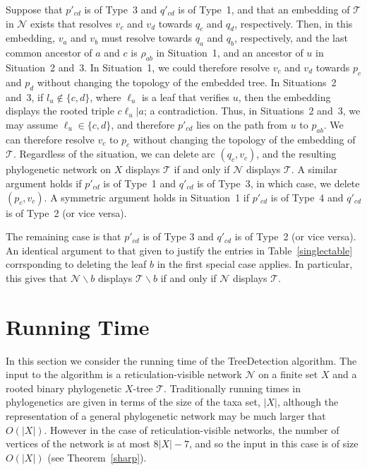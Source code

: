 \documentclass[11pt]{amsart}
\begin{document}
Suppose that $p'_{cd}$ is of Type~3 and $q'_{cd}$ is of Type~1, and that an embedding of ${{\mathcal T}}$ in ${{\mathcal N}}$ exists that resolves $v_c$ and $v_d$ towards $q_c$ and $q_d$, respectively. Then, in this embedding, $v_a$ and $v_b$ must resolve towards $q_a$ and $q_b$, respectively, and the last common ancestor of $a$ and $c$ is $\rho_{ab}$ in Situation~1, and an ancestor of $u$ in Situation~2 and~3. In Situation~1, we could therefore resolve $v_c$ and $v_d$ towards $p_c$ and $p_d$ without changing the topology of the embedded tree. In Situations~2 and~3, if $l_u\not\in \{c, d\}$, where $\ell_u$ is a leaf that verifies $u$, then the embedding displays the rooted triple $c\ell_u|a$; a contradiction. Thus, in Situations~2 and~3, we may assume $\ell_u\in \{c, d\}$, and therefore $p'_{cd}$ lies on the path from $u$ to $p_{ab}$. We can therefore resolve $v_c$ to $p_c$ without changing the topology of the embedding of ${{\mathcal T}}$. Regardless of the situation, we can delete arc $(q_c, v_c)$, and the resulting phylogenetic network on $X$ displays ${{\mathcal T}}$ if and only if ${{\mathcal N}}$ displays ${{\mathcal T}}$. A similar argument holds if $p'_{cd}$ is of Type~1 and $q'_{cd}$ is of Type~3, in which case, we delete $(p_c, v_c)$. A symmetric argument holds in Situation~1 if $p'_{cd}$ is of Type~4 and $q'_{cd}$ is of Type~2 (or vice versa).

The remaining case is that $p'_{cd}$ is of Type 3 and $q'_{cd}$ is of Type~2 (or vice versa). An identical argument to that given to justify the entries in Table~\ref{singlectable} corrsponding to deleting the leaf $b$ in the first special case applies. In particular, this gives that ${{\mathcal N}}\backslash b$ displays ${{\mathcal T}}\backslash b$ if and only if ${{\mathcal N}}$ displays ${{\mathcal T}}$.

\section{Running Time}
\label{running}

In this section we consider the running time of the {\sc TreeDetection} algorithm. The input to the algorithm is a reticulation-visible network ${{\mathcal N}}$ on a finite set $X$ and a rooted binary phylogenetic $X$-tree ${{\mathcal T}}$. Traditionally running times in phylogenetics are given in terms of the size of the taxa set, $|X|$, although  the representation of a general phylogenetic network may be much larger that $O(|X|)$. However in the case of reticulation-visible networks, the number of vertices of the network is at most $8|X|-7$, and so the input in this case is of size $O(|X|)$ (see Theorem~\ref{sharp}).
\end{document}
